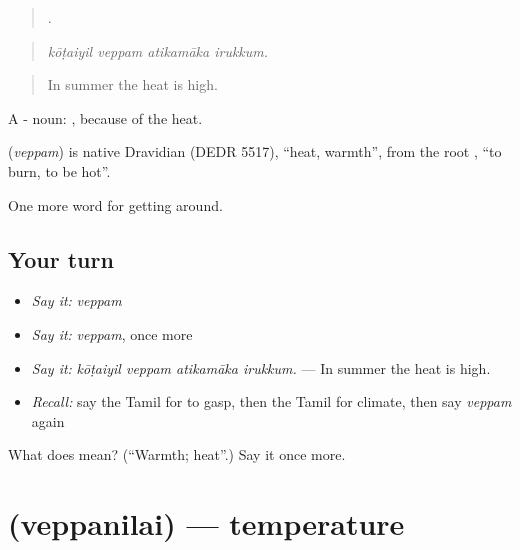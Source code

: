 \begin{quote}
   .
\end{quote}

\begin{quote}
\emph{kōṭaiyil veppam atikamāka irukkum.}
\end{quote}

\begin{quote}
In summer the heat is high.
\end{quote}

A - noun: , because of the heat.

\begin{cousinweb}
\textbf{} (\emph{veppam}) is native Dravidian (DEDR 5517), \textquotedblleft{}heat, warmth\textquotedblright{}, from the root , \textquotedblleft{}to burn, to be hot\textquotedblright{}.
\end{cousinweb}

\begin{grammarlens}[title={What you've built}]
One more word for getting around.
\end{grammarlens}

\subsection*{Your turn}
\begin{itemize}
\raggedright
  \item \emph{Say it:} \emph{veppam}
  \item \emph{Say it:} \emph{veppam}, once more
  \item \emph{Say it:} \emph{kōṭaiyil veppam atikamāka irukkum.} — In summer the heat is high.
  \item \emph{Recall:} say the Tamil for to gasp, then the Tamil for climate, then say \emph{veppam} again
\end{itemize}

\begin{tcolorbox}[breakable,colback=teal!4,colframe=teal!35!black,title={Before you move on}]
What does  mean? (\textquotedblleft{}Warmth; heat\textquotedblright{}.) Say it once more.
\end{tcolorbox}
\section[\texorpdfstring{\ta{வெப்பநிலை} (veppanilai)}{வெப்பநிலை (veppanilai)}]{ (veppanilai) — temperature}

